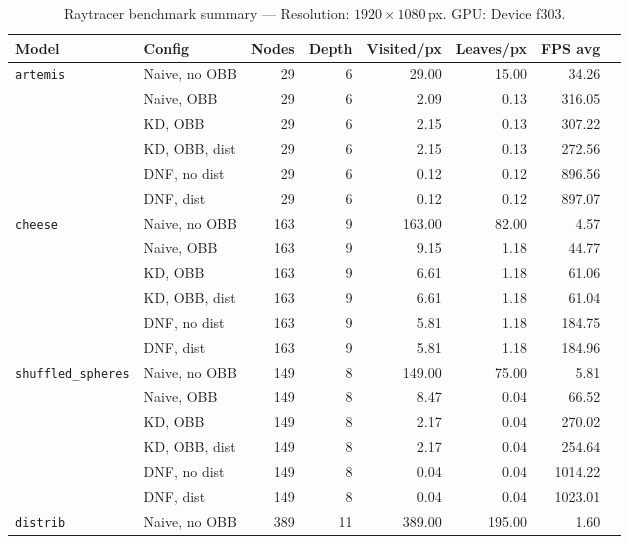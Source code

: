 
\begin{table}[htbp]
  \centering\small
  \setlength{\tabcolsep}{4pt}
  \caption{Raytracer benchmark summary --- Resolution: $1920\times1080$\,px. GPU: Device f303.}
  \label{tab:rt-summary}
  \begin{tabular}{@{}llrrrrrr@{}}
    \toprule
    \textbf{Model} & \textbf{Config} & \textbf{Nodes} & \textbf{Depth} & \textbf{Visited/px} & \textbf{Leaves/px} & \textbf{FPS avg} \\
    \midrule
    \multirow{6}{*}{\texttt{artemis}} & Naive, no OBB & 29 & 6 & 29.00 & 15.00 & 34.26 \\
     & Naive, OBB & 29 & 6 & 2.09 & 0.13 & 316.05 \\
     & KD, OBB & 29 & 6 & 2.15 & 0.13 & 307.22 \\
     & KD, OBB, dist & 29 & 6 & 2.15 & 0.13 & 272.56 \\
     & DNF, no dist & 29 & 6 & 0.12 & 0.12 & 896.56 \\
     & DNF, dist & 29 & 6 & 0.12 & 0.12 & 897.07 \\
    \midrule
    \multirow{6}{*}{\texttt{cheese}} & Naive, no OBB & 163 & 9 & 163.00 & 82.00 & 4.57 \\
     & Naive, OBB & 163 & 9 & 9.15 & 1.18 & 44.77 \\
     & KD, OBB & 163 & 9 & 6.61 & 1.18 & 61.06 \\
     & KD, OBB, dist & 163 & 9 & 6.61 & 1.18 & 61.04 \\
     & DNF, no dist & 163 & 9 & 5.81 & 1.18 & 184.75 \\
     & DNF, dist & 163 & 9 & 5.81 & 1.18 & 184.96 \\
    \midrule
    \multirow{6}{*}{\texttt{shuffled\_spheres}} & Naive, no OBB & 149 & 8 & 149.00 & 75.00 & 5.81 \\
     & Naive, OBB & 149 & 8 & 8.47 & 0.04 & 66.52 \\
     & KD, OBB & 149 & 8 & 2.17 & 0.04 & 270.02 \\
     & KD, OBB, dist & 149 & 8 & 2.17 & 0.04 & 254.64 \\
     & DNF, no dist & 149 & 8 & 0.04 & 0.04 & 1014.22 \\
     & DNF, dist & 149 & 8 & 0.04 & 0.04 & 1023.01 \\
    \midrule
    \multirow{6}{*}{\texttt{distrib}} & Naive, no OBB & 389 & 11 & 389.00 & 195.00 & 1.60 \\

\end{tabular}
\end{table}
